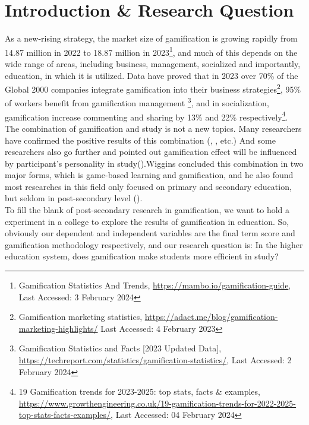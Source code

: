 \documentclass[12pt]{article} %
\begin{document}
\section*{Introduction \& Research Question}
\noindent As a new-rising strategy, the market size of gamification is growing rapidly from 14.87 million in 2022 to 18.87 million in 2023\footnote{Gamification Statistics And Trends, \url{https://mambo.io/gamification-guide}, Last Accessed: 3 February 2024}, and much of this depends on the wide range of areas, including business, management, socialized and importantly, education, in which it is utilized. Data have proved that in 2023 over 70\% of the Global 2000 companies integrate gamification into their business strategies\footnote{Gamification marketing statistics, \url{https://adact.me/blog/gamification-marketing-highlights/} Last Accessed: 4 February 2023}, 95\% of workers benefit from gamification management \footnote{Gamification Statistics and Facts [2023 Updated Data], \url{https://techreport.com/statistics/gamification-statistics/}, Last Accessed: 2 February 2024}, and in socialization, gamification increase commenting and sharing by 13\% and 22\% respectively\footnote{19 Gamification trends for 2023-2025: top stats, facts \& examples,\url{ https://www.growthengineering.co.uk/19-gamification-trends-for-2022-2025-top-stats-facts-examples/}, Last Accessed: 04 February 2024}.\\

\noindent The combination of gamification and study is not a new topics. Many researchers have confirmed the positive results of this combination (\cite{putz2020can}, \cite{bicen2018perceptions}, \cite{amriani2013empirical} etc.) And some researchers also go further and pointed out gamification effect will be influenced by participant's personality in study(\cite{smiderle2020impact}).Wiggins concluded this combination in two major forms, which is game-based learning and gamification, and he also found most researches in this field only focused on primary and secondary education, but seldom in post-secondary level (\cite{wiggins2016overview}).\\

\noindent To fill the blank of post-secondary research in gamification, we want to hold a experiment in a college to explore the results of gamification in education. So, obviously our dependent and independent variables are the final term score and gamification methodology respectively, and our research question is: In the higher education system, does gamification make students more efficient in study? \\
\end{document}

